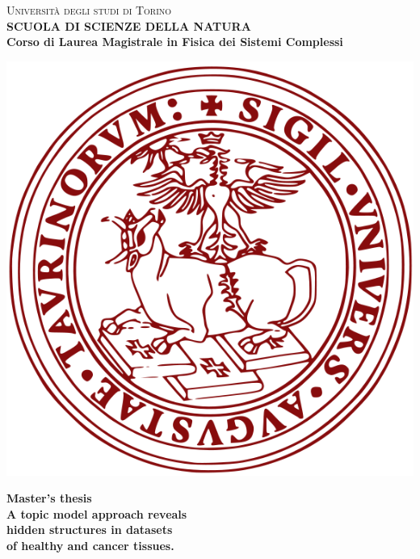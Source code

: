 \begin{titlepage}
\begin{center}
{{\Large{\textsc{Universit\`a degli studi di Torino \\}}}} \vspace{5mm} {\small{\bf SCUOLA DI SCIENZE DELLA NATURA\\ \vspace{3mm}
Corso di Laurea Magistrale in Fisica dei Sistemi Complessi}}
\vspace{5mm}
\end{center}
\begin{center}
\includegraphics[scale=.3]{head/logo.png}
\end{center}
\begin{center}
\vspace{5mm}
{\large{\bf Master's thesis\\}}
\vspace{5mm}
{\LARGE{\bf A topic model approach reveals \\hidden structures in datasets \\ of healthy and cancer tissues.\\}}
\end{center}
\vspace{21mm}

\end{titlepage}
